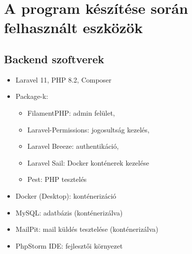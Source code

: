 \section{A program készítése során felhasznált eszközök}
\label{sec:softwares}

\subsection{Backend szoftverek}

\begin{itemize}
    \item Laravel 11, PHP 8.2, Composer
    \item Package-k: 
    \begin{itemize}
        \item FilamentPHP: admin felület,
        \item Laravel-Permissions: jogosultság kezelés,
        \item Laravel Breeze: authentikáció,
        \item Laravel Sail: Docker konténerek kezelése
        \item Pest: PHP tesztelés
    \end{itemize}
    \item Docker (Desktop): konténerizáció
    \item MySQL: adatbázis (konténerizálva)
    \item MailPit: mail küldés tesztelése (konténerizálva)
    \item PhpStorm IDE: fejlesztői környezet
\end{itemize}